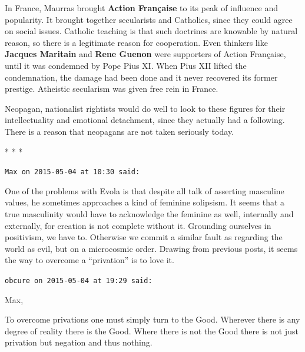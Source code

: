 In France, Maurras brought \textbf{Action Française} to its peak of influence and popularity. It brought together secularists and Catholics, since they could agree on social issues. Catholic teaching is that such doctrines are knowable by natural reason, so there is a legitimate reason for cooperation. Even thinkers like \textbf{Jacques Maritain} and \textbf{Rene Guenon} were supporters of Action Française, until it was condemned by Pope Pius XI. When Pius XII lifted the condemnation, the damage had been done and it never recovered its former prestige. Atheistic secularism was given free rein in France.

Neopagan, nationalist rightists would do well to look to these figures for their intellectuality and emotional detachment, since they actually had a following. There is a reason that neopagans are not taken seriously today.



\begin{center}* * *\end{center}

\begin{footnotesize}
\begin{sffamily}

\texttt{Max on 2015-05-04 at 10:30 said:}

One of the problems with Evola is that despite all talk of asserting masculine values, he sometimes approaches a kind of feminine solipsism. It seems that a true masculinity would have to acknowledge the feminine as well, internally and externally, for creation is not complete without it. Grounding ourselves in positivism, we have to. Otherwise we commit a similar fault as regarding the world as evil, but on a microcosmic order. Drawing from previous posts, it seems the way to overcome a ``privation'' is to love it.

\hfill

\texttt{obcure on 2015-05-04 at 19:29 said:}

Max,

To overcome privations one must simply turn to the Good. Wherever there is any degree of reality there is the Good. Where there is not the Good there is not just privation but negation and thus nothing.

\hfill

\end{sffamily}
\end{footnotesize}

